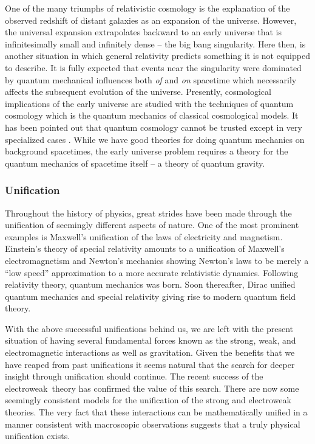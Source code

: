 \documentclass[aps,amssymb,12pt]{revtex4-2}
\begin{document}
One of the many triumphs of relativistic cosmology is the explanation of the
observed redshift of distant galaxies as an expansion of the universe.
However, the universal expansion extrapolates backward to an early universe
that is infinitesimally small and infinitely dense -- the big bang
singularity. Here then, is another situation in which general relativity
predicts something it is not equipped to describe. It is fully expected that
events near the singularity were dominated by quantum mechanical influences
both {\it of} and {\it on} spacetime which necessarily affects the
subsequent evolution of the universe. Presently, cosmological implications
of the early universe are studied with the techniques of quantum cosmology
\cite{14} which is the quantum mechanics of classical cosmological models. It has
been pointed out that quantum cosmology cannot be trusted except in very
specialized cases \cite{15}. While we have good theories for doing quantum
mechanics on background spacetimes, the early universe problem requires a
theory for the quantum mechanics of spacetime itself -- a theory of quantum
gravity.

\subsubsection{Unification}

Throughout the history of physics, great strides have been made through the
unification of seemingly different aspects of nature. One of the most
prominent examples is Maxwell's unification of the laws of electricity and
magnetism. Einstein's theory of special relativity amounts to a unification
of Maxwell's electromagnetism and Newton's mechanics showing Newton's laws
to be merely a ``low speed'' approximation to a more accurate relativistic
dynamics. Following relativity theory, quantum mechanics was born. Soon
thereafter, Dirac unified quantum mechanics and special relativity giving
rise to modern quantum field theory.

With the above successful unifications behind us, we are left with the
present situation of having several fundamental forces known as the strong,
weak, and electromagnetic interactions as well as gravitation. Given the
benefits that we have reaped from past unifications it seems natural that
the search for deeper insight through unification should continue. The
recent success of the electroweak{\it \ }theory has confirmed the value of
this search. There are now some seemingly consistent models for the
unification of the strong and electroweak theories. The very fact that these
interactions can be mathematically unified in a manner consistent with
macroscopic observations suggests that a truly physical unification exists.
\end{document}
